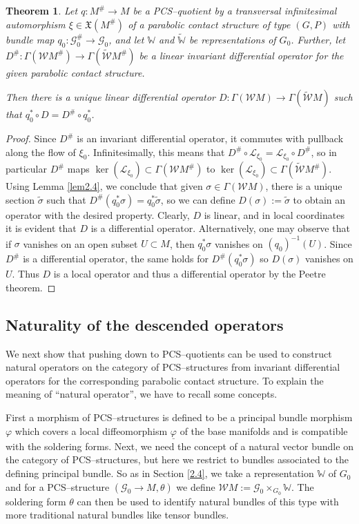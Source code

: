 \documentclass[12pt,a4paper]{amsart}
\def\frak{\mathfrak}
\def\Bbb{\mathbb}
\def\Cal{\mathcal}
\let\phi\varphi
\newcommand{\x}{\times}
\renewcommand{\o}{\circ}
\newcommand{\ph}{\phi}
\renewcommand{\th}{\theta}
\newcommand{\si}{\sigma}
\newcommand{\Ga}{\Gamma}
\newcommand{\tcw}{{\tilde{\Cal W}}}
\newcommand{\tbw}{{\tilde{\Bbb W}}}
\newcounter{theorem}
\numberwithin{theorem}{section}
\newtheorem{thm}[theorem]{Theorem}
\theoremstyle{definition}
\theoremstyle{remark}
\begin{document}
\begin{thm}\label{thm2.4}
  Let $q:M^\#\to M$ be a PCS--quotient by a transversal infinitesimal
  automorphism $\xi\in\frak X(M^\#)$ of a parabolic contact structure
  of type $(G,P)$ with bundle map $q_0:\Cal G_0^\#\to\Cal G_0$, and
  let $\Bbb W$ and $\tbw$ be representations of $G_0$. Further, let
  $D^\#:\Ga(\Cal WM^\#)\to\Ga(\tcw M^\#)$ be a linear invariant
  differential operator for the given parabolic contact structure.

  Then there is a unique linear differential operator
  $D:\Ga(\Cal WM)\to\Ga(\tcw M)$ such that $q_0^*\o D=D^\#\o q_0^*$.
\end{thm}
\begin{proof}
  Since $D^\#$ is an invariant differential operator, it commutes with
  pullback along the flow of $\xi_0$. Infinitesimally, this means that
  $D^\#\o\Cal L_{\xi_0}=\Cal L_{\xi_0}\o D^\#$, so in particular
  $D^\#$ maps $\ker(\Cal L_{\xi_0})\subset\Ga(\Cal WM^\#)$ to $
  \ker(\Cal L_{\xi_0})\subset\Ga(\tcw M^\#)$. Using Lemma \ref{lem2.4},
  we conclude that given $\si\in\Ga(\Cal WM)$, there is a unique
  section $\tilde\si$ such that $D^\#(q_0^*\si)=q_0^*\tilde\si$, so we
  can define $D(\si):=\tilde\si$ to obtain an operator with the
  desired property. Clearly, $D$ is linear, and in local coordinates
  it is evident that $D$ is a differential operator. Alternatively,
  one may observe that if $\si$ vanishes on an open subset $U\subset
  M$, then $q_0^*\si$ vanishes on $(q_0)^{-1}(U)$. Since $D^\#$ is a
  differential operator, the same holds for $D^\#(q_0^*\si)$ so
  $D(\si)$ vanishes on $U$. Thus $D$ is a local operator and thus a
  differential operator by the Peetre theorem.
\end{proof}

\subsection{Naturality of the descended operators}\label{2.5} 
We next show that pushing down to PCS--quotients can be used to
construct natural operators on the category of PCS--structures from
invariant differential operators for the corresponding parabolic
contact structure. To explain the meaning of ``natural operator'', we
have to recall some concepts.

First a morphism of PCS--structures is defined to be a principal
bundle morphism $\ph$ which covers a local diffeomorphism
$\underline{\ph}$ of the base manifolds and is compatible with the
soldering forms. Next, we need the concept of a natural vector bundle
on the category of PCS--structures, but here we restrict to bundles
associated to the defining principal bundle. So as in Section
\ref{2.4}, we take a representation $\Bbb W$ of $G_0$ and for a
PCS--structure $(\Cal G_0\to M,\th)$ we define $\Cal WM:=\Cal
G_0\x_{G_0}\Bbb W$. The soldering form $\th$ can then be used to
identify natural bundles of this type with more traditional natural
bundles like tensor bundles.
\end{document}
